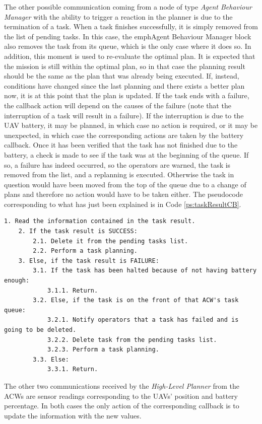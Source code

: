 \documentclass[fontsize=11pt, English=false, Español=true, Myfinal=true, twoside, numbers=noenddot]{scrbook}
\begin{document}
{The other possible communication coming from a node of type \emph{Agent Behaviour Manager} with the ability to trigger a reaction in the planner is due to the termination of a task. When a task finishes successfully, it is simply removed from the list of pending tasks. In this case, the emph{Agent Behaviour Manager} block also removes the task from its queue, which is the only case where it does so. In addition, this moment is used to re-evaluate the optimal plan. It is expected that the mission is still within the optimal plan, so in that case the planning result should be the same as the plan that was already being executed. If, instead, conditions have changed since the last planning and there exists a better plan now, it is at this point that the plan is updated. If the task ends with a failure, the callback action will depend on the causes of the failure (note that the interruption of a task will result in a failure). If the interruption is due to the \gls{UAV} battery, it may be planned, in which case no action is required, or it may be unexpected, in which case the corresponding actions are taken by the battery callback. Once it has been verified that the task has not finished due to the battery, a check is made to see if the task was at the beginning of the queue. If so, a failure has indeed occurred, so the operators are warned, the task is removed from the list, and a replanning is executed. Otherwise the task in question would have been moved from the top of the queue due to a change of plans and therefore no action would have to be taken either. The pseudocode corresponding to what has just been explained is in Code \ref{ps:taskResultCB}.

\begin{lstlisting}[caption={Callback that runs when an \emph{Agent Behaviour Manager} sends a task result}, breaklines=true, label=ps:taskResultCB]
	1. Read the information contained in the task result.
	2. If the task result is SUCCESS:
		2.1. Delete it from the pending tasks list.
		2.2. Perform a task planning.
	3. Else, if the task result is FAILURE:
		3.1. If the task has been halted because of not having battery enough:
			3.1.1. Return.
		3.2. Else, if the task is on the front of that ACW's task queue:
			3.2.1. Notify operators that a task has failed and is going to be deleted.
			3.2.2. Delete task from the pending tasks list.
			3.2.3. Perform a task planning.
		3.3. Else:
			3.3.1. Return.
\end{lstlisting}

The other two communications received by the \emph{High-Level Planner} from the \glspl{ACW} are sensor readings corresponding to the \glspl{UAV}' position and battery percentage. In both cases the only action of the corresponding callback is to update the information with the new values.

}
\end{document}
